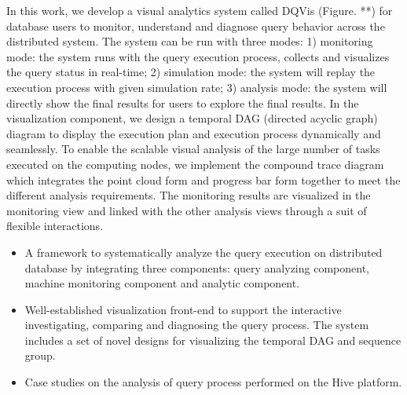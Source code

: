 In this work, we develop a visual analytics system called DQVis (Figure. **) for database users to monitor, understand and diagnose query behavior across the distributed system. The system can be run with three modes: 1) monitoring mode: the system runs with the query execution process, collects and visualizes the query status in real-time; 2) simulation mode: the system will replay the execution process with given simulation rate; 3) analysis mode: the system will directly show the final results for users to explore the final results. In the visualization component, we design a temporal DAG (directed acyclic graph) diagram to display the execution plan and execution process dynamically and seamlessly. To enable the scalable visual analysis of the large number of tasks executed on the computing nodes, we implement the compound trace diagram which integrates the point cloud form and progress bar form together to meet the different analysis requirements. The monitoring results are visualized in the monitoring view and linked with the other analysis views through a suit of flexible interactions. 


\begin{itemize}
\item A framework to systematically analyze the query execution on distributed database by integrating three components: query analyzing component, machine monitoring component and analytic component.
\item Well-established visualization front-end to support the interactive investigating, comparing and diagnosing the query process. The system includes a set of novel designs for visualizing the temporal DAG and sequence group.
\item Case studies on the analysis of query process performed on the Hive platform.
\end{itemize}